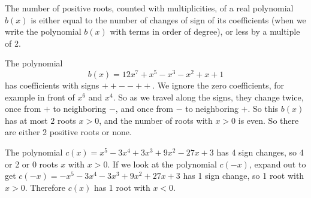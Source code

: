 \begin{theorem}[Descartes]
The number of positive roots, counted with multiplicities, of a real polynomial \(b(x)\) is either equal to the number of changes of sign of its coefficients (when we write the polynomial \(b(x)\) with terms in order of degree), or less by a multiple of 2.
\end{theorem}
\begin{example}
The polynomial
\[
b(x)=12x^7+x^5-x^3-x^2+x+1
\]
has coefficients with signs \(++--++\).
We ignore the zero coefficients, for example in front of \(x^6\) and \(x^4\).
So as we travel along the signs, they change twice, once from \(+\) to neighboring \(-\), and once from \(-\) to neighboring \(+\).
So this \(b(x)\) has at most \(2\) roots \(x>0\), and the number of roots with \(x>0\) is even.
So there are either 2 positive roots or none.
\end{example}
\begin{example}
The polynomial \(c(x)=x^5-3x^4+3x^3+9x^2-27x+3\) has 4 sign changes, so 4 or 2 or 0 roots \(x\) with \(x>0\).
If we look at the polynomial \(c(-x)\), expand out to get \(c(-x)=-x^5-3x^4-3x^3+9x^2+27x+3\) has 1 sign change, so 1 root with \(x>0\).
Therefore \(c(x)\) has 1 root with \(x < 0\).
\end{example}

